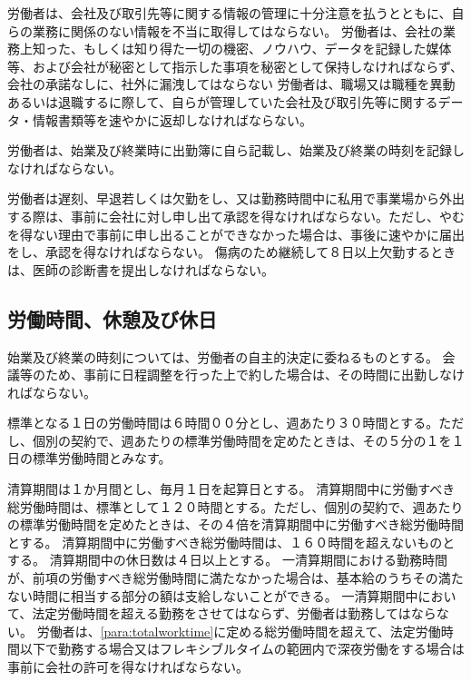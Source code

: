 \documentclass[10pt,a4paper]{jsarticle}
\begin{document}
労働者は、会社及び取引先等に関する情報の管理に十分注意を払うとともに、自らの業務に関係のない情報を不当に取得してはならない。
\label{para:confidentiality}
\term
労働者は、会社の業務上知った、もしくは知り得た一切の機密、ノウハウ、データを記録した媒体等、および会社が秘密として指示した事項を秘密として保持しなければならず、会社の承諾なしに、社外に漏洩してはならない
\term
労働者は、職場又は職種を異動あるいは退職するに際して、自らが管理していた会社及び取引先等に関するデータ・情報書類等を速やかに返却しなければならない。

労働者は、始業及び終業時に出勤簿に自ら記載し、始業及び終業の時刻を記録しなければならない。

労働者は遅刻、早退若しくは欠勤をし、又は勤務時間中に私用で事業場から外出する際は、事前に会社に対し申し出て承認を得なければならない。ただし、やむを得ない理由で事前に申し出ることができなかった場合は、事後に速やかに届出をし、承認を得なければならない。
\term
傷病のため継続して８日以上欠勤するときは、医師の診断書を提出しなければならない。




\subsection{労働時間、休憩及び休日}

\label{para:time}
始業及び終業の時刻については、労働者の自主的決定に委ねるものとする。
\term
会議等のため、事前に日程調整を行った上で約した場合は、その時間に出勤しなければならない。

\label{para:standardworktime}
標準となる１日の労働時間は６時間００分とし、週あたり３０時間とする。ただし、個別の契約で、週あたりの標準労働時間を定めたときは、その５分の１を１日の標準労働時間とみなす。

清算期間は１か月間とし、毎月１日を起算日とする。
\term
清算期間中に労働すべき総労働時間は、標準として１２０時間とする。ただし、個別の契約で、週あたりの標準労働時間を定めたときは、その４倍を清算期間中に労働すべき総労働時間とする。
\term
清算期間中に労働すべき総労働時間は、１６０時間を超えないものとする。
\term
清算期間中の休日数は４日以上とする。
\term
一清算期間における勤務時間が、前項の労働すべき総労働時間に満たなかった場合は、基本給のうちその満たない時間に相当する部分の額は支給しないことができる。
\label{para:totalworktime}
\term
一清算期間中において、法定労働時間を超える勤務をさせてはならず、労働者は勤務してはならない。
\term
労働者は、\ref{para:totalworktime}に定める総労働時間を超えて、法定労働時間以下で勤務する場合又はフレキシブルタイムの範囲内で深夜労働をする場合は事前に会社の許可を得なければならない。
\end{document}
